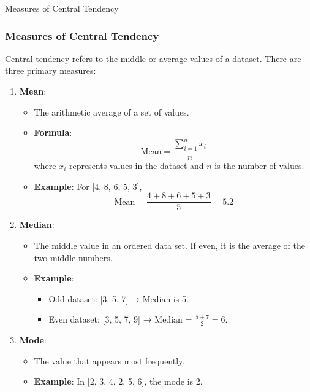 \documentclass[aspectratio=169]{beamer}
\begin{document}
\begin{frame}[fragile]{Measures of Central Tendency}
  \frametitle{Measures of Central Tendency}
  Central tendency refers to the middle or average values of a dataset. There are three primary measures:

  \begin{enumerate}
    \item \textbf{Mean}:
      \begin{itemize}
        \item The arithmetic average of a set of values.
        \item \textbf{Formula}:
          \begin{equation}
          \text{Mean} = \frac{\sum_{i=1}^{n} x_i}{n}
          \end{equation}
          where \( x_i \) represents values in the dataset and \( n \) is the number of values.
        \item \textbf{Example}: For [4, 8, 6, 5, 3],
          \[
          \text{Mean} = \frac{4 + 8 + 6 + 5 + 3}{5} = 5.2
          \]
      \end{itemize}

    \item \textbf{Median}:
      \begin{itemize}
        \item The middle value in an ordered data set. If even, it is the average of the two middle numbers.
        \item \textbf{Example}:
          \begin{itemize}
            \item Odd dataset: [3, 5, 7] → Median is 5.
            \item Even dataset: [3, 5, 7, 9] → Median = \(\frac{5 + 7}{2} = 6\).
          \end{itemize}
      \end{itemize}

    \item \textbf{Mode}:
      \begin{itemize}
        \item The value that appears most frequently.
        \item \textbf{Example}: In [2, 3, 4, 2, 5, 6], the mode is 2.
      \end{itemize}
  \end{enumerate}
\end{frame}
\end{document}
